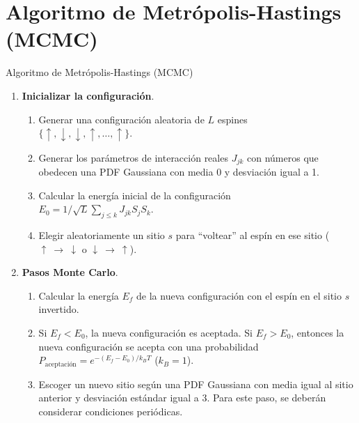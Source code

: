 \documentclass[xcolor=dvipsnames,presentation]{beamer}%
\begin{document}
{
\AtBeginSection{}
\section{Algoritmo de Metrópolis-Hastings (MCMC)}
\begin{frame}{Algoritmo de Metrópolis-Hastings (MCMC)}
\begin{enumerate}
\item \textbf{Inicializar la configuración}.
\begin{enumerate}
\item Generar una configuración aleatoria de $L$ espines\\
$\{ \uparrow,\downarrow,\downarrow,\uparrow,\ldots,\uparrow\}$.
\item Generar los parámetros de interacción reales $J_{jk}$ con números que 
obedecen una PDF Gaussiana con media 0 y desviación igual a 1.
\item Calcular la energía inicial de la configuración\\
$E_0=1/\sqrt{L}\sum_{j\leq k}J_{jk}S_jS_k$.
\item Elegir aleatoriamente un sitio $s$ para ``voltear'' al espín en 
ese sitio ($\uparrow\ \to\ \downarrow$ o $\downarrow\ \to\ \uparrow$).
\end{enumerate}
\item \textbf{Pasos Monte Carlo}. 
\begin{enumerate}
\item Calcular la energía $E_f$ de la nueva configuración con el espín en el
sitio $s$ invertido.
\item Si $E_f<E_0$, la nueva configuración es aceptada. Si $E_f>E_0$,
entonces la nueva configuración se acepta con una probabilidad 
$P_{\text{aceptación}}=e^{-(E_f-E_0)/k_BT}$ ($k_B=1$).
\item Escoger un nuevo sitio según una PDF Gaussiana con media
igual al sitio anterior y desviación estándar igual a $3$.
Para este paso, se deberán considerar condiciones periódicas.
\end{enumerate}
\end{enumerate}
\end{frame}
}
\end{document}
